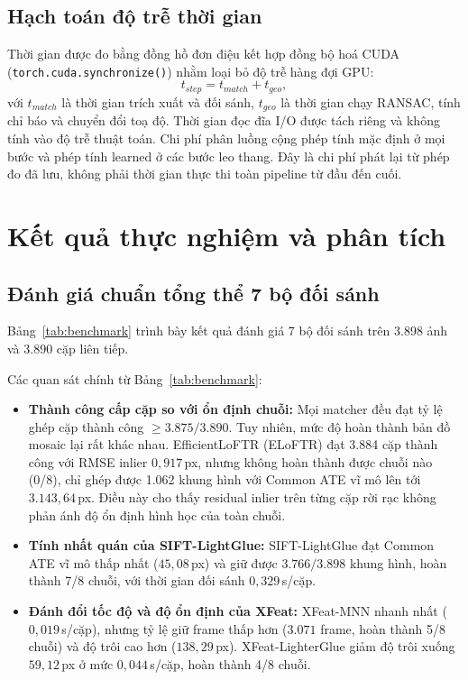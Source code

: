 \documentclass[conference]{IEEEtran}
\begin{document}
\subsection{Hạch toán độ trễ thời gian}
\label{subsec:metric_latency}

Thời gian được đo bằng đồng hồ đơn điệu kết hợp đồng bộ hoá CUDA (\texttt{torch.cuda.synchronize()}) nhằm loại bỏ độ trễ hàng đợi GPU:
\begin{equation}
t_{step} = t_{match} + t_{geo},
\label{eq:time_accounting_vi}
\end{equation}
với $t_{match}$ là thời gian trích xuất và đối sánh, $t_{geo}$ là thời gian chạy RANSAC, tính chỉ báo và chuyển đổi toạ độ. Thời gian đọc đĩa I/O được tách riêng và không tính vào độ trễ thuật toán.
Chi phí phân luồng cộng phép tính mặc định ở mọi bước và phép tính learned ở các bước leo thang. Đây là chi phí phát lại từ phép đo đã lưu, không phải thời gian thực thi toàn pipeline từ đầu đến cuối.

\section{Kết quả thực nghiệm và phân tích}
\label{sec:results}

\subsection{Đánh giá chuẩn tổng thể 7 bộ đối sánh}
\label{subsec:benchmark_results}

Bảng~\ref{tab:benchmark} trình bày kết quả đánh giá 7 bộ đối sánh trên 3.898 ảnh và 3.890 cặp liên tiếp.

\begin{table}[t]
\centering
\caption{Đánh giá chuẩn các bộ đối sánh đặc trưng trên 8 chuỗi bay UAV}
\label{tab:benchmark}
\footnotesize

\end{table}

Các quan sát chính từ Bảng~\ref{tab:benchmark}:
\begin{itemize}
    \item \textbf{Thành công cấp cặp so với ổn định chuỗi:} Mọi matcher đều đạt tỷ lệ ghép cặp thành công $\ge 3.875/3.890$. Tuy nhiên, mức độ hoàn thành bản đồ mosaic lại rất khác nhau. EfficientLoFTR (ELoFTR) đạt 3.884 cặp thành công với RMSE inlier $0{,}917$\,px, nhưng không hoàn thành được chuỗi nào (0/8), chỉ ghép được 1.062 khung hình với Common ATE vĩ mô lên tới $3.143{,}64$\,px. Điều này cho thấy residual inlier trên từng cặp rời rạc không phản ánh độ ổn định hình học của toàn chuỗi.
    \item \textbf{Tính nhất quán của SIFT-LightGlue:} SIFT-LightGlue đạt Common ATE vĩ mô thấp nhất ($45{,}08$\,px) và giữ được $3.766/3.898$ khung hình, hoàn thành 7/8 chuỗi, với thời gian đối sánh $0{,}329$\,s/cặp.
    \item \textbf{Đánh đổi tốc độ và độ ổn định của XFeat:} XFeat-MNN nhanh nhất ($0{,}019$\,s/cặp), nhưng tỷ lệ giữ frame thấp hơn ($3.071$ frame, hoàn thành 5/8 chuỗi) và độ trôi cao hơn ($138{,}29$\,px). XFeat-LighterGlue giảm độ trôi xuống $59{,}12$\,px ở mức $0{,}044$\,s/cặp, hoàn thành 4/8 chuỗi.
\end{itemize}
\end{document}
